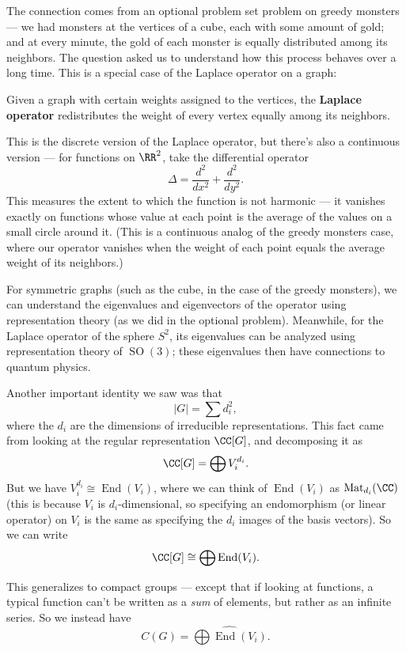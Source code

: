 The connection comes from an optional problem set problem on greedy monsters --- we had monsters at the vertices of a cube, each with some amount of gold; and at every minute, the gold of each monster is equally distributed among its neighbors. The question asked us to understand how this process behaves over a long time. This is a special case of the Laplace operator on a graph:

\begin{definition}
Given a graph with certain weights assigned to the vertices, the \textbf{Laplace operator} redistributes the weight of every vertex equally among its neighbors.  
\end{definition}

This is the discrete version of the Laplace operator, but there's also a continuous version --- for functions on $\RR^2$, take the differential operator \[\Delta = \frac{d^2}{dx^2} + \frac{d^2}{dy^2}.\] This measures the extent to which the function is not harmonic --- it vanishes exactly on functions whose value at each point is the average of the values on a small circle around it. (This is a continuous analog of the greedy monsters case, where our operator vanishes when the weight of each point equals the average weight of its neighbors.)

For symmetric graphs (such as the cube, in the case of the greedy monsters), we can understand the eigenvalues and eigenvectors of the operator using representation theory (as we did in the optional problem). Meanwhile, for the Laplace operator of the sphere $S^2$, its eigenvalues can be analyzed using representation theory of $\operatorname{SO}(3)$; these eigenvalues then have connections to quantum physics. 

Another important identity we saw was that \[\lvert G \rvert = \sum d_i^2,\] where the $d_i$ are the dimensions of irreducible representations. This fact came from looking at the regular representation $\CC[G]$, and decomposing it as \[\CC[G] = \bigoplus V_i^{d_i}.\] But we have $V_i^{d_i} \cong \operatorname{End}(V_i)$, where we can think of $\operatorname{End}(V_i)$ as $\operatorname{Mat}_{d_i}(\CC)$ (this is because $V_i$ is $d_i$-dimensional, so specifying an endomorphism (or linear operator) on $V_i$ is the same as specifying the $d_i$ images of the basis vectors). So we can write \[\CC[G] \cong \bigoplus \operatorname{End}(V_i).\] 

This generalizes to compact groups --- except that if looking at functions, a typical function can't be written as a \emph{sum} of elements, but rather as an infinite series. So we instead have \[C(G) = \widehat{\bigoplus \operatorname{End}(V_i)}.\] 

